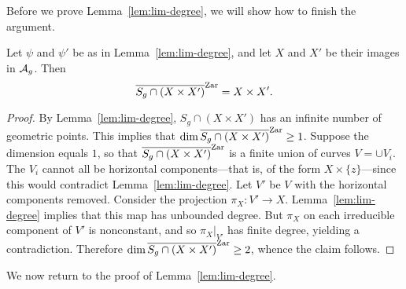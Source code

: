 \documentclass{amsart}
\begin{document}
Before we prove Lemma~\ref{lem:lim-degree}, we will show how to finish the argument.

\begin{corollary}
  Let $\psi$ and $\psi'$ be as in Lemma~\ref{lem:lim-degree}, and let $X$ and $X'$ be their images in $\mathcal{A}_g$. Then
  \[
    \overline{S_g \cap (X \times X')}^\mathrm{Zar} = X \times X'.
  \]
\end{corollary}
\begin{proof}
  By Lemma~\ref{lem:lim-degree}, $S_g \cap (X \times X')$ has an infinite number of geometric points. This implies that $\dim \overline{S_g \cap (X \times X')}^\mathrm{Zar} \geq 1$. Suppose the dimension equals $1$, so that $\overline{S_g \cap (X \times X')}^\mathrm{Zar}$ is a finite union of curves $V = \cup V_i$. The $V_i$ cannot all be horizontal components---that is, of the form $X \times \{z\}$---since this would contradict Lemma~\ref{lem:lim-degree}. Let $V'$ be $V$ with the horizontal components removed. Consider the projection $\pi_X: V' \to X$. Lemma~\ref{lem:lim-degree} implies that this map has unbounded degree. But $\pi_X$ on each irreducible component of $V'$ is nonconstant, and so $\pi_X|_{V'}$ has finite degree, yielding a contradiction. Therefore $\dim \overline{S_g \cap (X \times X')}^\mathrm{Zar} \geq 2$, whence the claim follows.
\end{proof}

We now return to the proof of Lemma~\ref{lem:lim-degree}.
\end{document}
